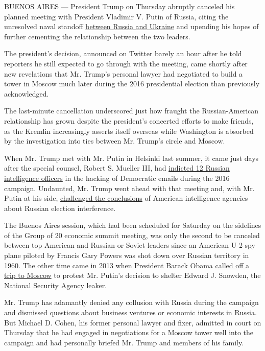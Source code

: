 BUENOS AIRES --- President Trump on Thursday abruptly canceled his
planned meeting with President Vladimir V. Putin of Russia, citing the
unresolved naval standoff
\href{https://www.nytimes.com/2018/11/26/world/europe/russia-ukraine-kerch-strait.html}{between
Russia and Ukraine} and upending his hopes of further cementing the
relationship between the two leaders.

The president's decision, announced on Twitter barely an hour after he
told reporters he still expected to go through with the meeting, came
shortly after new revelations that Mr. Trump's personal lawyer had
negotiated to build a tower in Moscow much later during the 2016
presidential election than previously acknowledged.

The last-minute cancellation underscored just how fraught the
Russian-American relationship has grown despite the president's
concerted efforts to make friends, as the Kremlin increasingly asserts
itself overseas while Washington is absorbed by the investigation into
ties between Mr. Trump's circle and Moscow.

When Mr. Trump met with Mr. Putin in Helsinki last summer, it came just
days after the special counsel, Robert S. Mueller III, had
\href{https://www.nytimes.com/2018/07/13/us/politics/mueller-indictment-russian-intelligence-hacking.html}{indicted
12 Russian intelligence officers} in the hacking of Democratic emails
during the 2016 campaign. Undaunted, Mr. Trump went ahead with that
meeting and, with Mr. Putin at his side,
\href{https://www.nytimes.com/2018/07/16/world/europe/trump-putin-election-intelligence.html}{challenged
the conclusions} of American intelligence agencies about Russian
election interference.

The Buenos Aires session, which had been scheduled for Saturday on the
sidelines of the Group of 20 economic summit meeting, was only the
second to be canceled between top American and Russian or Soviet leaders
since an American U-2 spy plane piloted by Francis Gary Powers was shot
down over Russian territory in 1960. The other time came in 2013 when
President Barack Obama
\href{https://www.nytimes.com/2013/08/08/world/europe/obama-cancels-visit-to-putin-as-snowden-adds-to-tensions.html}{called
off a trip to Moscow} to protest Mr. Putin's decision to shelter Edward
J. Snowden, the National Security Agency leaker.

Mr. Trump has adamantly denied any collusion with Russia during the
campaign and dismissed questions about business ventures or economic
interests in Russia. But Michael D. Cohen, his former personal lawyer
and fixer, admitted in court on Thursday that he had engaged in
negotiations for a Moscow tower well into the campaign and had
personally briefed Mr. Trump and members of his family.

